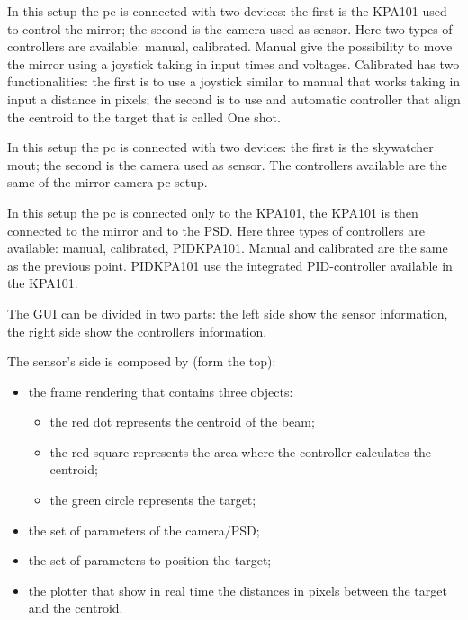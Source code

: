 In this setup the pc is connected with two devices: the first is
the KPA101 used to control the mirror; the second is the camera used as
sensor. Here two types of controllers are available: manual,
calibrated. Manual give the possibility to move the mirror using a joystick taking
in input times and voltages. Calibrated has two functionalities: the first is to use a joystick
similar to manual that works taking in input a distance in pixels; the
second is to use and automatic controller that align the centroid to the
target that is called One shot.

In this setup the pc is connected with two devices: the first is
the skywatcher mout; the second is the camera used as
sensor. The controllers available are the same of the mirror-camera-pc setup.

In this setup the pc is connected only to the KPA101, the KPA101 is
then connected to the mirror and to the PSD. Here three types of controllers are available: manual, calibrated, PIDKPA101. Manual and calibrated are the same as the previous point. PIDKPA101 use the integrated PID-controller available in the KPA101.



The GUI can be divided in two parts: the left side show the sensor
information, the right side show the controllers information.

The sensor's side is composed by (form the top):

\begin{itemize}
      \item
            the frame rendering that contains three objects:
            \begin{itemize}

                  \item
                        the red dot represents the centroid of the beam;
                  \item
                        the red square represents the area where the controller calculates the
                        centroid;
                  \item
                        the green circle represents the target;
            \end{itemize}

      \item
            the set of parameters of the camera/PSD;
      \item
            the set of parameters to position the target;
      \item
            the plotter that show in real time the distances in pixels between the
            target and the centroid.
\end{itemize}

